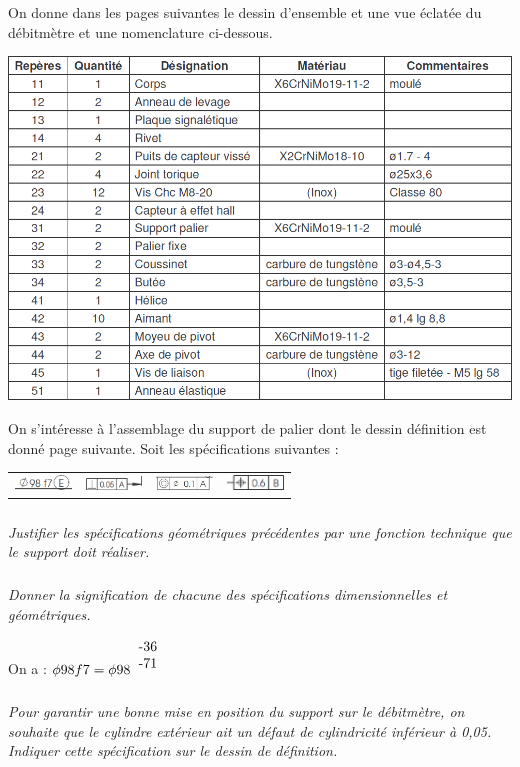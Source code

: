 \documentclass[10pt,fleqn]{article} %
\begin{document}
\begin{multicols}{2}
On donne dans les pages suivantes le dessin d'ensemble et une vue éclatée du débitmètre et une nomenclature ci-dessous.
\begin{center}
\includegraphics[width=\linewidth]{images/debitmetre_04}
\end{center}


On s'intéresse à l'assemblage du support de palier dont le dessin définition est donné page suivante. 
Soit les spécifications suivantes : 
\begin{center}
\begin{tabular}{cccc}
\includegraphics[width=1.5cm]{images/debitmetre_05_a} &
\includegraphics[width=1.5cm]{images/debitmetre_05_b} &
\includegraphics[width=1.5cm]{images/debitmetre_05_c} &
\includegraphics[width=1.5cm]{images/debitmetre_05_d} \\
\end{tabular}
\end{center}

\subparagraph{}\textit{Justifier les spécifications géométriques précédentes par une fonction technique que le support doit réaliser. }

\subparagraph{}\textit{Donner la signification de chacune des spécifications dimensionnelles et géométriques.}

\begin{rem}
On a : $\phi 98 f7 = \phi 98 ^{\begin{tabular}{c}-36 \\ -71\end{tabular}}$
\end{rem}
\subparagraph{}\textit{Pour garantir une bonne mise en position du support sur le débitmètre, on souhaite que le cylindre extérieur ait un défaut de cylindricité inférieur à 0,05. Indiquer cette spécification sur le dessin de définition. }
\end{multicols}
\end{document}

